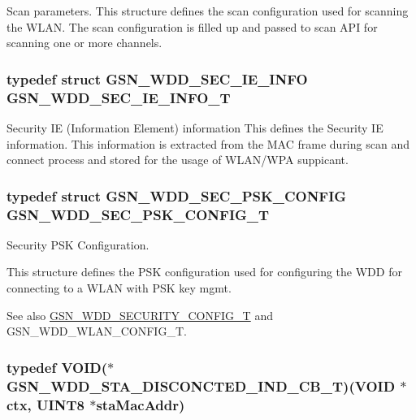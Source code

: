 Scan parameters. This structure defines the scan configuration used for scanning the WLAN. The scan configuration is filled up and passed to scan API for scanning one or more channels. 

\hypertarget{a00677_ga70a9458f62036ad38be0efc8a1b65560}{
\subsubsection[{GSN\_\-WDD\_\-SEC\_\-IE\_\-INFO\_\-T}]{\setlength{\rightskip}{0pt plus 5cm}typedef struct {\bf GSN\_\-WDD\_\-SEC\_\-IE\_\-INFO} {\bf GSN\_\-WDD\_\-SEC\_\-IE\_\-INFO\_\-T}}}
\label{a00677_ga70a9458f62036ad38be0efc8a1b65560}


Security IE (Information Element) information This defines the Security IE information. This information is extracted from the MAC frame during scan and connect process and stored for the usage of WLAN/WPA suppicant. 

\hypertarget{a00677_ga08bfb38518da7f8041c06cb1a661f471}{
\subsubsection[{GSN\_\-WDD\_\-SEC\_\-PSK\_\-CONFIG\_\-T}]{\setlength{\rightskip}{0pt plus 5cm}typedef struct {\bf GSN\_\-WDD\_\-SEC\_\-PSK\_\-CONFIG}  {\bf GSN\_\-WDD\_\-SEC\_\-PSK\_\-CONFIG\_\-T}}}
\label{a00677_ga08bfb38518da7f8041c06cb1a661f471}


Security PSK Configuration. 

This structure defines the PSK configuration used for configuring the WDD for connecting to a WLAN with PSK key mgmt. \begin{DoxySeeAlso}{See also}
\hyperlink{a00604_ab50f348fec494c964d4301472eee16de}{GSN\_\-WDD\_\-SECURITY\_\-CONFIG\_\-T} and GSN\_\-WDD\_\-WLAN\_\-CONFIG\_\-T. 
\end{DoxySeeAlso}
\hypertarget{a00677_ga3a4ef614815eaa2e3085c2d168a1ced5}{
\subsubsection[{GSN\_\-WDD\_\-STA\_\-DISCONCTED\_\-IND\_\-CB\_\-T}]{\setlength{\rightskip}{0pt plus 5cm}typedef VOID($\ast$ {\bf GSN\_\-WDD\_\-STA\_\-DISCONCTED\_\-IND\_\-CB\_\-T})(VOID $\ast$ctx, {\bf UINT8} $\ast$staMacAddr)}}
\label{a00677_ga3a4ef614815eaa2e3085c2d168a1ced5}



